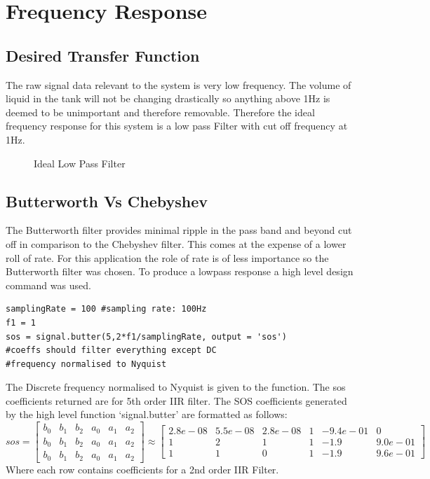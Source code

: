 \documentclass{article}
\begin{document}
\section{Frequency Response}
\subsection{Desired Transfer Function}
The raw signal data relevant to the system is very low frequency. The volume of liquid in the tank will not be changing drastically so anything above 1Hz is deemed to be unimportant and therefore removable. Therefore the ideal frequency response for this system is a low pass Filter with cut off frequency at 1Hz.
\begin{figure}[H]
    \centering
    
    \caption{Ideal Low Pass Filter}
    \label{fig:lowpass}
\end{figure}

\subsection{Butterworth Vs Chebyshev}
The Butterworth filter provides minimal ripple in the pass band and beyond cut off in comparison to the Chebyshev filter. This comes at the expense of a lower roll of rate. For this application the role of rate is of less importance so the Butterworth filter was chosen. To produce a lowpass response a high level design command was used.
\lstset{language=Python}
\begin{lstlisting}
samplingRate = 100 #sampling rate: 100Hz
f1 = 1
sos = signal.butter(5,2*f1/samplingRate, output = 'sos')
#coeffs should filter everything except DC
#frequency normalised to Nyquist
\end{lstlisting}
The Discrete frequency normalised to Nyquist is given to the function. The sos coefficients returned are for 5th order IIR filter. 
\newline
The SOS coefficients generated by the high level function `signal.butter' are formatted as follows:
 \[
   sos =
\begin{bmatrix}
b_0 & b_1 & b_2 & a_0 & a_1 & a_2\\
b_0 & b_1 & b_2 & a_0 & a_1 & a_2\\
b_0 & b_1 & b_2 & a_0 & a_1 & a_2
\end{bmatrix} \approx
\begin{bmatrix}
2.8e-08 & 5.5e-08 & 2.8e-08 & 1 & -9.4e-01 & 0\\
1 & 2 & 1 & 1 & -1.9 & 9.0e-01\\
1 & 1 & 0 & 1 & -1.9 & 9.6e-01
\end{bmatrix}
\]
Where each row contains coefficients for a 2nd order IIR Filter.
\end{document}
